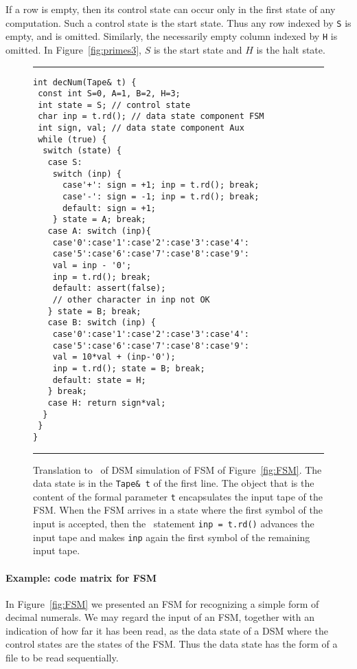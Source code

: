 \documentclass[preprint,11pt]{elsarticle}
\begin{document}
If a row is empty, then its control state can occur only 
in the first state of any computation.
Such a control state is the start state.
Thus any row indexed by {\tt S} is empty,
and is omitted.
Similarly, the necessarily empty column indexed by {\tt H}
is omitted.
In Figure~\ref{fig:primes3},
$S$ is the start state and
$H$ is the halt state.

\begin{figure}[htbp]
\hrule \vspace{0.1in}
\begin{center}
\begin{minipage}[t]{4in}
{\footnotesize
\begin{verbatim}
int decNum(Tape& t) {
 const int S=0, A=1, B=2, H=3;
 int state = S; // control state
 char inp = t.rd(); // data state component FSM
 int sign, val; // data state component Aux
 while (true) {
  switch (state) {
   case S:
    switch (inp) {
      case'+': sign = +1; inp = t.rd(); break;
      case'-': sign = -1; inp = t.rd(); break;
      default: sign = +1;
    } state = A; break;
   case A: switch (inp){
    case'0':case'1':case'2':case'3':case'4':
    case'5':case'6':case'7':case'8':case'9':
    val = inp - '0';
    inp = t.rd(); break;
    default: assert(false);
    // other character in inp not OK
   } state = B; break;
   case B: switch (inp) {
    case'0':case'1':case'2':case'3':case'4':
    case'5':case'6':case'7':case'8':case'9':
    val = 10*val + (inp-'0');
    inp = t.rd(); state = B; break;
    default: state = H;
   } break;
   case H: return sign*val;
  }
 }
}
\end{verbatim}
} \end{minipage}
\end{center}
\caption{\label{fig:decNum}
Translation to \cpp\ of
DSM simulation of FSM of Figure~\ref{fig:FSM}.
The data state is in the {\tt Tape\& t}
of the first line.
The object that is the content of the formal parameter
{\tt t} encapsulates the input tape of the FSM.
When the FSM arrives in a state where the first
symbol of the input is accepted,
then the \cpp\ statement {\tt inp = t.rd()}
advances the input tape and makes {\tt inp} again
the first symbol of the remaining input tape.
}
\vspace{0.1in}
\hrule
\end{figure}

\paragraph{Example: code matrix for FSM}
In Figure~\ref{fig:FSM} we presented an FSM for recognizing
a simple form of decimal numerals.
We may regard the input of an FSM, together
with an indication of how far it has been read,
as the data state of a DSM where the control states
are the states of the FSM.
Thus the data state has the form of a file to be read sequentially.
\end{document}
